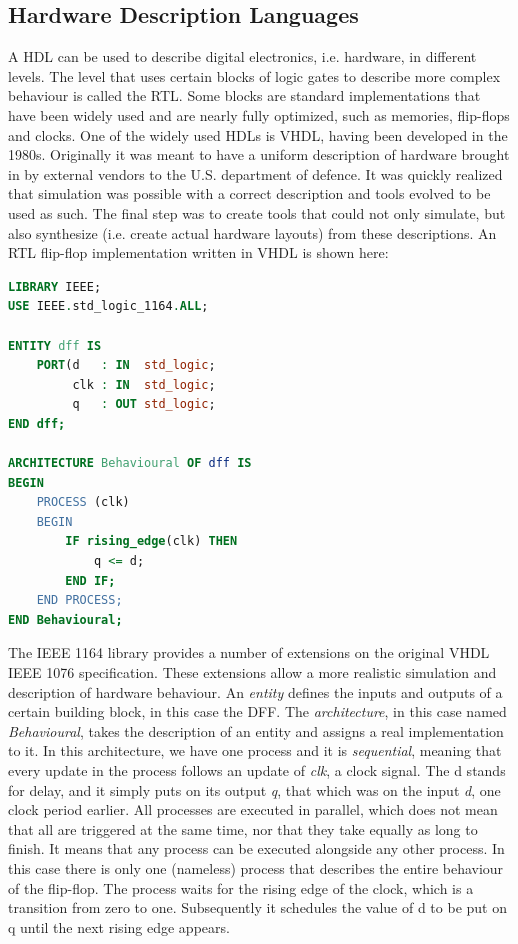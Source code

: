 \documentclass[11pt,british]{article}
\begin{document}
\subsection{Hardware Description Languages}
\label{subsec:HDL}
A \gls{HDL} can be used to describe digital electronics, i.e. hardware, in different levels. The level that uses certain blocks of logic gates to describe more complex behaviour is called the \gls{RTL}. Some blocks are standard implementations that have been widely used and are nearly fully optimized, such as memories, flip-flops and clocks. One of the widely used HDLs is \gls{VHDL}, having been developed in the 1980s. Originally it was meant to have a uniform description of hardware brought in by external vendors to the U.S. department of defence. It was quickly realized that simulation was possible with a correct description and tools evolved to be used as such.\cite{vhdlorigin,vhdlorigin2} The final step was to create tools that could not only simulate, but also synthesize (i.e. create actual hardware layouts) from these descriptions.\cite{vhdlsim, vhdlsynth, vhdlsynth2, vhdlsynth3} An \gls{RTL} flip-flop implementation written in \gls{VHDL} is shown here: 
\begin{lstlisting}[language=VHDL, tabsize=4, frame=single, framesep=2mm, belowskip=16pt, aboveskip=16pt, showstringspaces=false, basicstyle=\footnotesize]
LIBRARY IEEE;
USE IEEE.std_logic_1164.ALL;

ENTITY dff IS
	PORT(d 	 : IN  std_logic;
		 clk : IN  std_logic;
		 q 	 : OUT std_logic;
END dff;

ARCHITECTURE Behavioural OF dff IS
BEGIN
	PROCESS (clk)
	BEGIN
		IF rising_edge(clk) THEN
			q <= d;
		END IF;
	END PROCESS;
END Behavioural;
\end{lstlisting}
The \gls{IEEE} 1164 library provides a number of extensions on the original \gls{VHDL} IEEE 1076 specification. These extensions allow a more realistic simulation and description of hardware behaviour.\cite{IEEE1164} An \emph{entity} defines the inputs and outputs of a certain building block, in this case the \gls{DFF}. The \emph{architecture}, in this case named \emph{Behavioural}, takes the description of an entity and assigns a real implementation to it. In this architecture, we have one process and it is \emph{sequential}, meaning that every update in the process follows an update of \emph{clk}, a clock signal. The d stands for delay, and it simply puts on its output \emph{q}, that which was on the input \emph{d}, one clock period earlier. All processes are executed in parallel, which does not mean that all are triggered at the same time, nor that they take equally as long to finish. It means that any process can be executed alongside any other process. In this case there is only one (nameless) process that describes the entire behaviour of the flip-flop. The process waits for the rising edge of the clock, which is a transition from zero to one. Subsequently it schedules the value of d to be put on q until the next rising edge appears.
\end{document}

